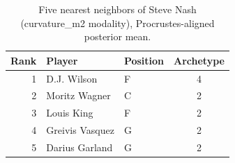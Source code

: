 \begin{table}[htbp]
  \centering\small
  \begin{tabular}{rllc}
    \toprule
    Rank & Player & Position & Archetype \\
    \midrule
    1 & D.J. Wilson & F & 4 \\
    2 & Moritz Wagner & C & 2 \\
    3 & Louis King & F & 2 \\
    4 & Greivis Vasquez & G & 2 \\
    5 & Darius Garland & G & 2 \\
    \bottomrule
  \end{tabular}
  \caption{Five nearest neighbors of Steve Nash (curvature_m2 modality), Procrustes-aligned posterior mean.}
  \label{tab:Steve_Nash_neighbors_curvature_m2}
\end{table}

